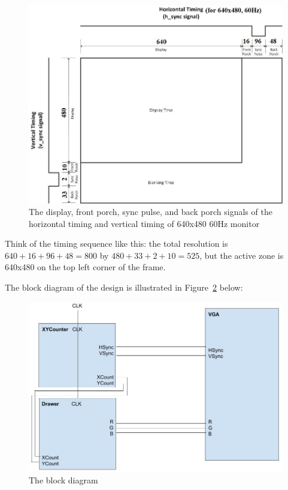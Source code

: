 \documentclass[12pt]{article}
\numberwithin{figure}{section}
\begin{document}
\begin{figure}[ht]
  \centering
  \includegraphics[width=\textwidth]{vga_timing_sequence_640x480_60hz.png}
  \caption{The display, front porch, sync pulse, and back porch signals of the horizontal timing and vertical timing of 640x480 60Hz monitor}
  \label{fig:640x480_60hz_vga_timing_sequence}
\end{figure}

Think of the timing sequence like this: the total resolution is $640 + 16 + 96 + 48 = 800$ by $480 + 33 + 2 + 10 = 525$, but the active zone is 640x480 on the top left corner of the frame.

The block diagram of the design is illustrated in Figure~\ref{fig:block_diagram} below:

\newpage

\begin{figure}[ht]
  \centering
  \includegraphics[width=\textwidth]{lab6_block_diagram.png}
  \caption{The block diagram}
  \label{fig:block_diagram}
\end{figure}
\end{document}
